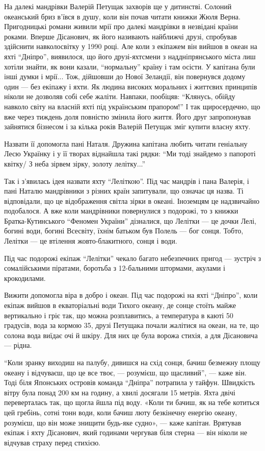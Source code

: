 На далекі мандрівки Валерій Петущак захворів ще у дитинстві. Солоний океанський
бриз в'ївся в душу, коли він почав читати книжки Жюля Верна. Пригодницькі
романи живили мрії про далекі мандрівки в незвідані країни роками. Вперше
Дісанович, як його називають найближчі друзі, спробував здійснити навколосвітку
у 1990 році. Але коли з екіпажем він вийшов в океан на яхті \enquote{Дніпро},
виявилося, що його друзі-яхтсмени з наддніпрянського міста лиш хотіли знайти,
як вони казали, \enquote{нормальну} країну і там осісти. У капітана були інші думки і
мрії... Тож, дійшовши до Нової Зеландії, він повернувся додому один — без
екіпажу і яхти. Як людина високих моральних і життєвих принципів ніколи не
дозволяв собі себе жаліти. Навпаки, пообіцяв: \enquote{Клянусь, обійду навколо світу на
власній яхті під українським прапором!} І так щиросердечно, що вже через
тиждень доля повністю змінила його життя. Його друг запропонував зайнятися
бізнесом і за кілька років Валерій Петущак зміг купити власну яхту.

Назвати її допомогла пані Наталя. Дружина капітана любить читати геніальну Лесю
Українку і у її творах віднайшла такі рядки: \enquote{Ми тоді знайдемо з папороті
квітку/ З неба зірвем зірку, золоту лелітку...}

Так і з'явилась ідея назвати яхту \enquote{Леліткою}. Під час мандрів і пана Валерія, і
пані Наталю мандрівники з різних країн запитували, що означає ця назва. Ті
відповідали, що це відображення світла зірки в океані. Іноземцям це надзвичайно
подобалося. А вже коли мандрівники повернулися з подорожі, то з книжки
Братка-Кутинського \enquote{Феномен України} дізналися, що Лелітки — це дочки Лелі,
богині води, богині Всесвіту, їхнім батьком був Полель — бог сонця. Тобто,
Лелітки — це втілення жовто-блакитного, сонця і води.

Під час подорожі екіпаж \enquote{Лелітки} чекало багато небезпечних пригод — зустріч з
сомалійськими піратами, боротьба з 12-бальними штормами, акулами і крокодилами.

Вижити допомогла віра в добро і океан. Під час подорожі на яхті \enquote{Дніпро}, коли
екіпаж вийшов в екваторіальні води Тихого океану, де сонце стоїть майже
вертикально і гріє так, що можна розплавитись, а температура в каюті 50
градусів, вода за кормою 35, друзі Петущака почали жалітися на океан, на те, що
солона вода виїдає очі й шкіру. Для них це була ворожа стихія, а для Дісановича
— рідна.

\enquote{Коли зранку виходиш на палубу, дивишся на схід сонця, бачиш безмежну площу
океану і відчуваєш, що це все твоє, — розумієш, що щасливий}, — каже він. Тоді
біля Японських островів команда \enquote{Дніпра} потрапила у тайфун. Швидкість вітру
була понад 200 км на годину, а хвилі досягали 15 метрів. Яхта двічі
переверталась так, що щогла йшла під воду. «Коли ти бачиш, як на тебе котиться
цей гребінь, сотні тонн води, коли бачиш люту безкінечну енергію океану,
розумієш, що він може знищити будь-яке судно», — каже капітан. Врятував екіпаж
і яхту Дісанович, який годинами чергував біля стерна — він ніколи не відчував
страху перед стихією.

